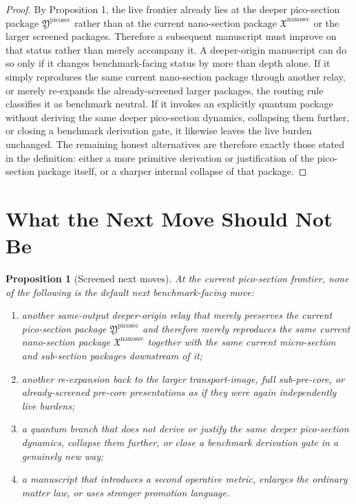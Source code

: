 \documentclass[11pt]{article}
\newcommand{\NanoSectionPackage}{\mathfrak X^{\mathrm{nanosec}}}
\newcommand{\PicoSectionPackage}{\mathfrak Y^{\mathrm{picosec}}}
\newtheorem{proposition}{Proposition}
\begin{document}
\begin{proof}
By Proposition 1, the live frontier already lies at the deeper pico-section package \(\PicoSectionPackage\) rather than at the current nano-section package \(\NanoSectionPackage\) or the larger screened packages. Therefore a subsequent manuscript must improve on that status rather than merely accompany it. A deeper-origin manuscript can do so only if it changes benchmark-facing status by more than depth alone. If it simply reproduces the same current nano-section package through another relay, or merely re-expands the already-screened larger packages, the routing rule classifies it as benchmark neutral. If it invokes an explicitly quantum package without deriving the same deeper pico-section dynamics, collapsing them further, or closing a benchmark derivation gate, it likewise leaves the live burden unchanged. The remaining honest alternatives are therefore exactly those stated in the definition: either a more primitive derivation or justification of the pico-section package itself, or a sharper internal collapse of that package.
\end{proof}

\section{What the Next Move Should Not Be}

\begin{proposition}[Screened next moves]
At the current pico-section frontier, none of the following is the default next benchmark-facing move:
\begin{enumerate}
    \item another same-output deeper-origin relay that merely preserves the current pico-section package \(\PicoSectionPackage\) and therefore merely reproduces the same current nano-section package \(\NanoSectionPackage\) together with the same current micro-section and sub-section packages downstream of it;
    \item another re-expansion back to the larger transport-image, full sub-pre-core, or already-screened pre-core presentations as if they were again independently live burdens;
    \item a quantum branch that does not derive or justify the same deeper pico-section dynamics, collapse them further, or close a benchmark derivation gate in a genuinely new way;
    \item a manuscript that introduces a second operative metric, enlarges the ordinary matter law, or uses stronger promotion language.
\end{enumerate}
\end{proposition}
\end{document}

